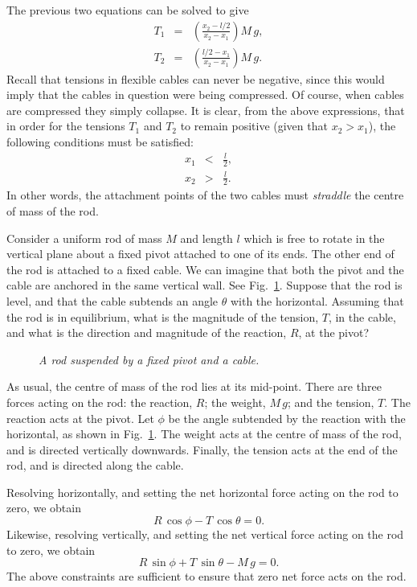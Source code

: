 The previous two equations can be solved to give
\begin{eqnarray}
T_1 &=& \left(\frac{x_2-l/2}{x_2-x_1}\right)M\,g,\\[0.5ex]
T_2 &=& \left(\frac{l/2-x_1}{x_2-x_1}\right)M\,g.
\end{eqnarray}
Recall that tensions in flexible cables can never be negative, since this would imply that
the cables in question were being compressed. Of course, when cables are compressed they simply
collapse.
It is clear, from the above expressions, that 
in order for the tensions $T_1$ and $T_2$ to remain positive (given that $x_2>x_1$), the following
conditions must be satisfied:
\begin{eqnarray}
x_1 &<& \frac{l}{2},\\[0.5ex]
x_2 &>& \frac{l}{2}.
\end{eqnarray}
In other words, the attachment points of the two cables must {\em straddle} the centre of
mass of the rod.

Consider a uniform rod of mass $M$ and length $l$ which is free to rotate in the vertical
plane about a fixed pivot attached to one of its ends. The other end of the rod is
attached to a fixed cable. We can imagine that both the pivot and the cable are anchored
in the same vertical wall. See Fig.~\ref{f93}.
Suppose that the rod is level, and that the cable subtends an angle $\theta$
with the horizontal.
Assuming that the rod is in equilibrium, what is the magnitude
of the tension, $T$, in the cable, and what is the direction and magnitude of the
reaction, $R$, at the pivot? 

\begin{figure}
\epsfysize=3in
\centerline{}
\caption{\em A rod suspended by a fixed pivot and a cable.}\label{f93}  
\end{figure}

As usual, the centre of mass of the rod lies at  its mid-point.
There are three forces acting on the rod: the reaction, $R$; the weight, $M\,g$; and the tension,
$T$. The reaction acts at the pivot.  Let $\phi$ be
the angle subtended by the reaction with the horizontal, as shown in Fig.~\ref{f93}. 
The weight acts at the centre of mass of the rod, and is directed
vertically downwards. Finally, the tension acts at the  end of the rod, and is directed along
the cable.

Resolving horizontally, and setting the net horizontal force acting on the rod to zero,
we obtain
\begin{equation}
R\,\cos\phi - T\,\cos\theta = 0.\label{e1099}
\end{equation}
Likewise, resolving vertically, and setting  the net vertical force acting on the rod to zero,
we obtain
\begin{equation}\label{e1088}
R\,\sin\phi + T\,\sin\theta - M\,g = 0.
\end{equation}
The above constraints are sufficient to ensure that zero net force acts on the rod. 


